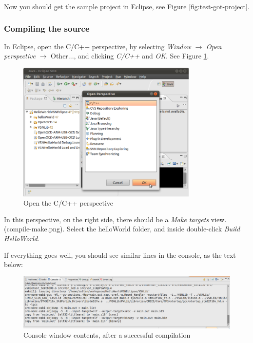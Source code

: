 \documentclass[a4paper, 10pt]{article}
\begin{document}
Now you should get the sample project in Eclipse, see
Figure \ref{fig:test-got-project}.

\subsubsection{Compiling the source}

In Eclipse, open the C/C++ perspective,  by selecting \emph{Window} $\rightarrow$
\emph{Open perspective} $\rightarrow$ Other...,
and clicking \emph{C/C++} and \emph{OK}.
See Figure \ref{fig:compile-c-perspective}.

    \begin{figure}[H]
    \centering
        \includegraphics[width=0.8\textwidth]{./install-guide-linux-images/compile-c-perspective.png}
        \caption{Open the C/C++ perspective}
        \label{fig:compile-c-perspective}
    \end{figure}

In this perspective,
on the right side, there should be a \emph{Make targets} view. (compile-make.png).
Select the helloWorld folder, and inside double-click \emph{Build HelloWorld}.

If everything goes well, you should see similar lines in the console, as the text below:

    \begin{figure}[H]
    \centering
        \includegraphics[width=\textwidth]{./install-guide-linux-images/compile-result.png}
        \caption{Console window contents, after a successful compilation}
        \label{fig:compile-result}
    \end{figure}
\end{document}
